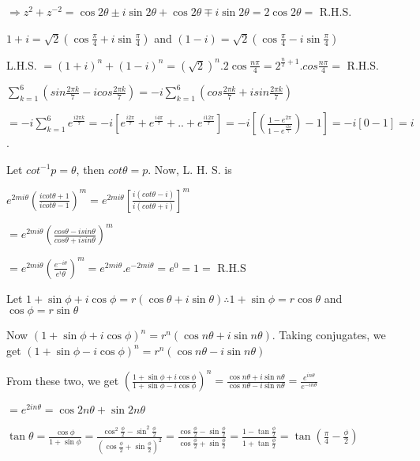   $\Rightarrow z^2 + z^{-2} = \cos2\theta \pm i\sin2\theta + \cos2\theta \mp i\sin2\theta = 2\cos2\theta =$
  R.H.S.
\item $1 + i = \sqrt{2}\left(\cos\frac{\pi}{4} + i\sin\frac{\pi}{4}\right)$ and $(1 - i) =
  \sqrt{2}\left(\cos\frac{\pi}{4} - i\sin\frac{\pi}{4}\right)$

  L.H.S. $= (1 + i)^n + (1 - i)^n = (\sqrt{2})^n.2\cos\frac{n\pi}{4} = 2^{\frac{n}{2} + 1}.cos\frac{n\pi}{4}
  =$ R.H.S.
\item $\displaystyle\sum_{k = 1}^6\left(sin\frac{2\pi k}{7} -icos\frac{2\pi k}{7}\right) = -i \sum_{k =
  1}^6\left(cos\frac{2\pi k}{7} + isin\frac{2\pi k}{7}\right)$

  $= -i \sum_{k = 1}^6 e^{\frac{i2\pi k}{7}} = -i \left[e^{\frac{i2\pi}{7}} + e^{\frac{i4\pi}{7}} + .. +
  e^{\frac{i12\pi}{7}}\right] = -i \left[\left(\frac{1 - e^{2\pi}}{1 - e^{\frac{i2\pi}{7}}}\right) -
  1\right] = -i [0 - 1] = i$.
\item Let $cot^{-1}p = \theta$, then $cot\theta = p$. Now, L. H. S. is

  $e^{2mi\theta}\left(\frac{icot\theta + 1}{icot\theta - 1}\right)^m  = e^{2mi\theta}\left[\frac{i(cot\theta
    - i)}{i(cot\theta + i)}\right]^m$

  $= e^{2mi\theta}\left(\frac{cos\theta - isin\theta}{cos\theta + isin\theta}\right)^m$

  $= e^{2mi\theta}\left(\frac{e^{-i\theta}}{e^i\theta}\right)^m = e^{2mi\theta} . e^{-2mi\theta} = e^0 = 1
  =$ R.H.S
\item Let $1 + \sin\phi + i \cos\phi = r(\cos\theta + i \sin\theta) \therefore 1 + \sin\phi = r\cos\theta$
  and $\cos\phi = r\sin\theta$

  Now $(1 + \sin\phi + i \cos\phi)^n = r^n(\cos n\theta + i\sin n\theta)$. Taking conjugates, we get $(1
  + \sin\phi - i \cos\phi)^n = r^n(\cos n\theta - i\sin n\theta)$

  From these two, we get $\left(\frac{1 + \sin\phi + i \cos\phi}{1 + \sin\phi - i \cos\phi}\right)^n =
  \frac{\cos n\theta + i\sin n\theta}{\cos n\theta - i\sin n\theta} = \frac{e^{in\theta}}{e^{-in\theta}}$

  $= e^{2in\theta} = \cos 2n\theta + \sin 2n\theta$

  $\tan \theta = \frac{\cos \phi}{1 + \sin \phi} = \frac{\cos^2\frac{\phi}{2} -
    \sin^2\frac{\phi}{2}}{\left(\cos\frac{\phi}{2} + \sin\frac{\phi}{2}\right)^2} =
  \frac{\cos\frac{\phi}{2} - \sin\frac{\phi}{2}}{\cos\frac{\phi}{2} + \sin\frac{\phi}{2}} = \frac{1 -
    \tan\frac{\phi}{2}}{1 + \tan\frac{\phi}{2}} = \tan\left(\frac{\pi}{4} - \frac{\phi}{2}\right)$

